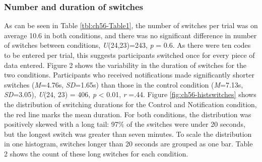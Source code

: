 \subsubsection{Number and duration of switches}
As can be seen in Table \ref{tbl:ch56-Table1}, the number of switches per trial was on average 10.6 in both conditions, and there was no significant difference in number of switches between conditions, \textit{U}(24,23)=243, \textit{p} = 0.6. As there were ten codes to be entered per trial, this suggests participants switched once for every piece of data entered.  
Figure 2 shows the variability in the duration of switches for the two conditions. Participants who received notifications made significantly shorter switches (\textit{M}=4.76s, \textit{SD}=1.65s) than those in the control condition (\textit{M}=7.13s, \textit{SD}=3.05), \textit{U}(24, 23) = 406, \textit{p} < 0.01, \textit{r} =.44. 
Figure \ref{fig:ch56-histswitches} shows the distribution of switching durations for the Control and Notification condition, the red line marks the mean duration. For both conditions, the distribution was positively skewed with a long tail: 97\% of the switches were under 20 seconds, but the longest switch was greater than seven minutes. To scale the distribution in one histogram, switches longer than 20 seconds are grouped as one bar. Table 2 shows the count of these long switches for each condition.

